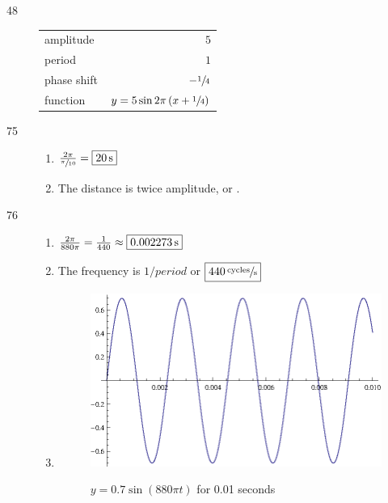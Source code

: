 \documentclass{exam}
\begin{document}
\begin{description}
    \item[48]
      \begin{tabular}[H]{lr}
        \toprule
        amplitude   & $5$ \\
        period      & $1$ \\
        phase shift & $- \sfrac{1}{4}$ \\
        function    & $y = 5 \sin 2 \pi \left( x + \sfrac{1}{4} \right)$ \\
        \bottomrule
      \end{tabular}

    \item[75]
      \begin{enumerate}[a]
        \item $\frac{2 \pi}{\sfrac{\pi}{10}} = \boxed{ \unit[20]{s} }$
        \item The distance is twice amplitude, or .
      \end{enumerate}

    \pagebreak

    \item[76]
      \begin{enumerate}[a]
        \item $\frac{2 \pi}{880 \pi} = \frac{1}{440} \approx \boxed{ \unit[ 0.002273 ]{s} }$
        \item The frequency is $1/period$ or $\boxed{ \unit[440]{\sfrac{cycles}{s}} }$

        \item
          \begin{figure}[H]
            \centering
            \includegraphics[scale=1.0]{exercise76.eps}

            $y = 0.7 \sin \left( 880 \pi t \right)$ for 0.01 seconds
          \end{figure}

      \end{enumerate}

    \end{description}
\end{document}
